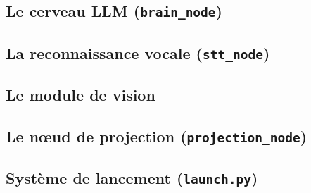 \documentclass[11pt]{article}
\begin{document}
\subsection{Le cerveau LLM (\texttt{brain\_node})}

\subsection{La reconnaissance vocale (\texttt{stt\_node})}

\subsection{Le module de vision}

\subsection{Le nœud de projection (\texttt{projection\_node})}

\subsection{Système de lancement (\texttt{launch.py})}
\end{document}
